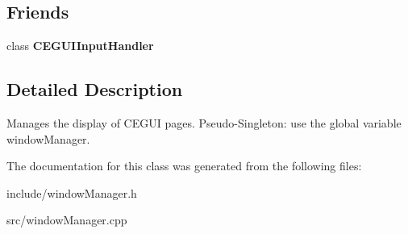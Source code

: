 \subsection*{\-Friends}
\begin{DoxyCompactItemize}
\item 
\hypertarget{classWindowManager_a6369d92b7b9756a868e3eef0f9c79d5d}{
class {\bfseries \-C\-E\-G\-U\-I\-Input\-Handler}}
\label{d9/d6e/classWindowManager_a6369d92b7b9756a868e3eef0f9c79d5d}

\end{DoxyCompactItemize}


\subsection{\-Detailed \-Description}
\-Manages the display of \-C\-E\-G\-U\-I pages. \-Pseudo-\/\-Singleton\-: use the global variable window\-Manager. 

\-The documentation for this class was generated from the following files\-:\begin{DoxyCompactItemize}
\item 
include/window\-Manager.\-h\item 
src/window\-Manager.\-cpp\end{DoxyCompactItemize}
